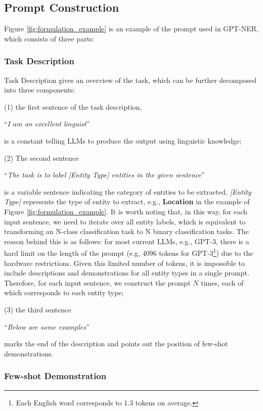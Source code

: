 \documentclass{article}
\begin{document}
\subsection{Prompt Construction}
\label{prompt_construction}

Figure \ref{fig:formulation_example} is an example of the prompt used in GPT-NER,
which consists of three parts:

\subsubsection{Task Description}
 Task Description gives an overview of the task, which can be further decomposed into three components:

(1)  the first sentence of the task description,

“\textit{I am an excellent linguist}”

\noindent is a constant telling LLMs to produce the output using linguistic knowledge;

(2)  The second sentence 

“\textit{The task is to label [Entity Type] entities in the given sentence}” 

\noindent is a variable sentence indicating the category of entities to be extracted, 
\textit{[Entity Type]} represents the type of entity to extract, e.g., \textbf{Location} in the example of Figure \ref{fig:formulation_example}.
It is worth noting that, in this way, for each input sentence, we need to iterate over all entity labels, which is equivalent to transforming an N-class classification task to N binary classification tasks. The reason behind this is as follows:
for most current LLMs, e.g., GPT-3, there is a hard limit on the length of the prompt (e.g, 4096 tokens for GPT-3\footnote{Each English word corresponds to 1.3 tokens on average.}) due to the hardware restrictions.
Given this limited number of tokens, 
it is  impossible to include descriptions and demonstrations
for all entity types in a single prompt. 
Therefore, for each input sentence, we construct the prompt $N$ times, each of which corresponds to each entity type;

(3) the third sentence 

“\textit{Below are some examples}” 

\noindent marks the end of the description and points out the position of few-shot demonstrations.

\subsubsection{Few-shot Demonstration}
\label{few_shot_demonstration}
\end{document}

